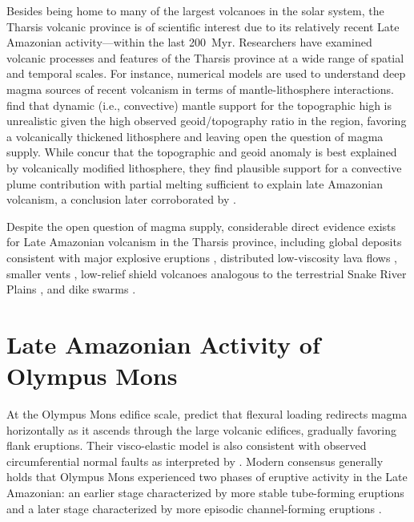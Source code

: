 Besides being home to many of the largest volcanoes in the solar system, the Tharsis volcanic province is of scientific interest due to its relatively recent Late Amazonian activity---within the last \qty{200}{Myr}. Researchers have examined volcanic processes and features of the Tharsis province at a wide range of spatial and temporal scales. For instance, numerical models are used to understand deep magma sources of recent volcanism in terms of mantle-lithosphere interactions. \textcite{roberts_plume-induced_2004} find that dynamic (i.e., convective) mantle support for the topographic high is unrealistic given the high observed geoid/topography ratio in the region, favoring a volcanically thickened lithosphere and leaving open the question of magma supply. While \textcite{redmond_numerical_2004} concur that the topographic and geoid anomaly is best explained by volcanically modified lithosphere, they find plausible support for a convective plume contribution with partial melting sufficient to explain late Amazonian volcanism, a conclusion later corroborated by \textcite{plesa_thermal_2018}.

Despite the open question of magma supply, considerable direct evidence exists for Late Amazonian volcanism in the Tharsis province, including global deposits consistent with major explosive eruptions \parencite{hynek_explosive_2003}, distributed low-viscosity lava flows \parencite{hauber_very_2011}, smaller vents \parencite{wilson_fissure_2009,richardson_small_2021}, low-relief shield volcanoes analogous to the terrestrial Snake River Plains \parencite{hauber_topography_2009}, and dike swarms \parencite{pieterek_late_2022}.

\section{Late Amazonian Activity of Olympus Mons}

At the Olympus Mons edifice scale, \textcite{mcgovern_state_1993} predict that flexural loading redirects magma horizontally as it ascends through the large volcanic edifices, gradually favoring flank eruptions. Their visco-elastic model is also consistent with observed circumferential normal faults as interpreted by \textcite{thomas_flank_1990}. Modern consensus generally holds that Olympus Mons experienced two phases of eruptive activity in the Late Amazonian: an earlier stage characterized by more stable tube-forming eruptions and a later stage characterized by more episodic channel-forming eruptions \parencite{bleacher_olympus_2007,peters_flank_2017}.

